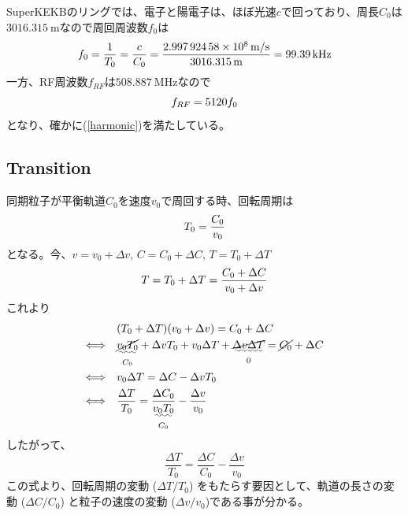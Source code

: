 \documentclass[10pt,a4paper]{ltjsarticle}
\begin{document}
\begin{tcolorbox}[title=\textgt{SuperKEKBにおける$f_{RF}$, $f_{0}$, $h$}の関係]
    SuperKEKBのリングでは、電子と陽電子は、ほぼ光速$c$で回っており、周長$C_0$は$\SI{3016.315}{\meter}$なので周回周波数$f_0$は
    \begin{equation}
      f_0 = \frac{1}{T_0}=\frac{c}{C_0}=\frac{\SI{2.99792458e8}{\meter / \second}}{\SI{3016.315}{\meter}}=\SI{99.39}{\kilo\hertz} \notag
    \end{equation}
    一方、RF周波数$f_{RF}$は$\SI{508.887}{\mega\hertz}$なので
    \begin{equation}
        f_{RF} = 5120 f_0 \notag
    \end{equation}
    となり、確かに(\ref{harmonic})を満たしている。
\end{tcolorbox}

\subsection{Transition}
同期粒子が平衡軌道$C_0$を速度$v_0$で周回する時、回転周期は
%
\begin{equation}
    T_0 = \frac{C_0}{v_0} \notag
\end{equation}
%
となる。今、$v = v_0 + \Delta v$, $C = C_0 + \Delta C$, $T=T_0 + \Delta T$
%
\begin{equation}
    T = T_0 + \Delta T = \frac{C_0 + \Delta C}{v_0 + \Delta v}\notag
\end{equation}
%
これより
%
\begin{align}
    & (T_0 + \Delta T)(v_0 + \Delta v) = C_0 + \Delta C \notag \\
    \Longleftrightarrow\quad & \underset{C_0}{\uwave{\cancel{v_0 T_0}}} + \Delta v T_0 + v_0 \Delta T +
    \underset{0}{\uwave{\cancel{\Delta v \Delta T}}}
    = \cancel{C_0} + \Delta C \notag \\
    \Longleftrightarrow\quad & v_0 \Delta T = \Delta C- \Delta v T_0 \notag \\
    \Longleftrightarrow\quad & \frac{\Delta T}{T_0} = \frac{\Delta C_0}{\underset{C_0}{\uwave{v_0 T_0}}} - \frac{\Delta v}{v_0} \notag
\end{align}
%
したがって、
%
\begin{equation}
    \frac{\Delta T}{T_0} = \frac{\Delta C}{C_0} - \frac{\Delta v}{v_0}
\end{equation}
%
この式より、回転周期の変動 ($\Delta T/T_0$) をもたらす要因として、軌道の長さの変動 ($\Delta C/C_0$) と粒子の速度の変動 ($\Delta v/v_0$)である事が分かる。
\end{document}
